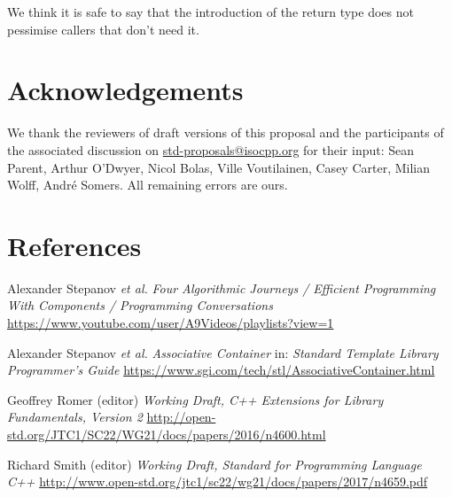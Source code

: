 \documentclass[11pt]{article}
\begin{document}
We think it is safe to say that the introduction of the return type
does not pessimise callers that don't need it.

\section{Acknowledgements}

We thank the reviewers of draft versions of this proposal and the
participants of the associated discussion on
\url{std-proposals@isocpp.org} for their input: Sean Parent, Arthur
O'Dwyer, Nicol Bolas, Ville Voutilainen, Casey Carter, Milian Wolff,
Andr\'e Somers. All remaining errors are ours.

\section{References}
\renewcommand{\section}[2]{}%
\begin{thebibliography}{9}
  Alexander Stepanov \emph{et al.}\newline
  \emph{Four Algorithmic Journeys / Efficient Programming With Components /
    Programming Conversations}\newline
  \url{https://www.youtube.com/user/A9Videos/playlists?view=1}

  Alexander Stepanov \emph{et al.}\newline
  \emph{Associative Container}\newline
  in: \emph{Standard Template Library Programmer's Guide}\newline
  \url{https://www.sgi.com/tech/stl/AssociativeContainer.html}

  Geoffrey Romer (editor)\newline
  \emph{Working Draft, C++ Extensions for Library Fundamentals, Version 2}\newline
  \url{http://open-std.org/JTC1/SC22/WG21/docs/papers/2016/n4600.html}

  Richard Smith (editor)\newline
  \emph{Working Draft, Standard for Programming Language C++}\newline
  \url{http://www.open-std.org/jtc1/sc22/wg21/docs/papers/2017/n4659.pdf}
\end{thebibliography}
\end{document}
